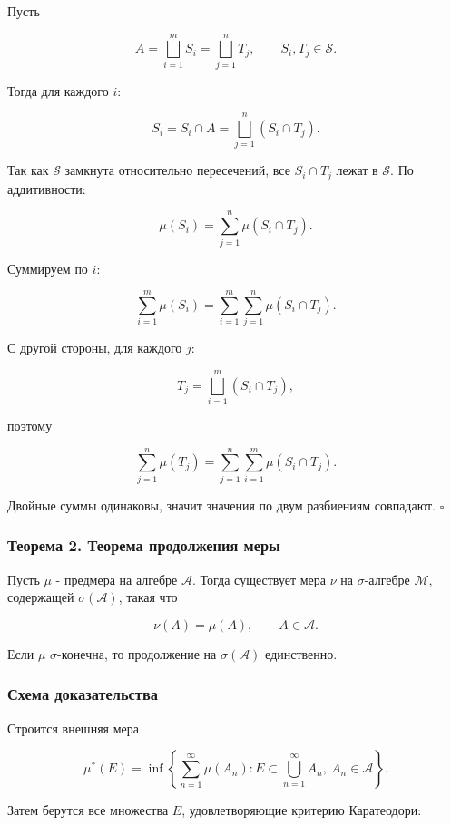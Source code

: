 \documentclass[
  11pt,
  a4paper,
]{article}
\begin{document}
Пусть

\[
A=\bigsqcup_{i=1}^m S_i
=
\bigsqcup_{j=1}^n T_j,
\qquad S_i,T_j\in\mathcal S.
\]

Тогда для каждого \(i\):

\[
S_i=S_i\cap A
=
\bigsqcup_{j=1}^n(S_i\cap T_j).
\]

Так как \(\mathcal S\) замкнута относительно пересечений, все
\(S_i\cap T_j\) лежат в \(\mathcal S\). По аддитивности:

\[
\mu(S_i)=\sum_{j=1}^n\mu(S_i\cap T_j).
\]

Суммируем по \(i\):

\[
\sum_{i=1}^m\mu(S_i)
=
\sum_{i=1}^m\sum_{j=1}^n\mu(S_i\cap T_j).
\]

С другой стороны, для каждого \(j\):

\[
T_j=\bigsqcup_{i=1}^m(S_i\cap T_j),
\]

поэтому

\[
\sum_{j=1}^n\mu(T_j)
=
\sum_{j=1}^n\sum_{i=1}^m\mu(S_i\cap T_j).
\]

Двойные суммы одинаковы, значит значения по двум разбиениям совпадают.
\(\square\)

\subsubsection{Теорема 2. Теорема продолжения
меры}\label{ux442ux435ux43eux440ux435ux43cux430-2.-ux442ux435ux43eux440ux435ux43cux430-ux43fux440ux43eux434ux43eux43bux436ux435ux43dux438ux44f-ux43cux435ux440ux44b}

Пусть \(\mu\) - предмера на алгебре \(\mathcal A\). Тогда существует
мера \(\nu\) на \(\sigma\)-алгебре \(\mathcal M\), содержащей
\(\sigma(\mathcal A)\), такая что

\[
\nu(A)=\mu(A),\qquad A\in\mathcal A.
\]

Если \(\mu\) \(\sigma\)-конечна, то продолжение на
\(\sigma(\mathcal A)\) единственно.

\subsubsection{Схема
доказательства}\label{ux441ux445ux435ux43cux430-ux434ux43eux43aux430ux437ux430ux442ux435ux43bux44cux441ux442ux432ux430}

Строится внешняя мера

\[
\mu^*(E)=
\inf\left\{
\sum_{n=1}^{\infty}\mu(A_n):
E\subset\bigcup_{n=1}^{\infty}A_n,\ A_n\in\mathcal A
\right\}.
\]

Затем берутся все множества \(E\), удовлетворяющие критерию Каратеодори:
\end{document}
